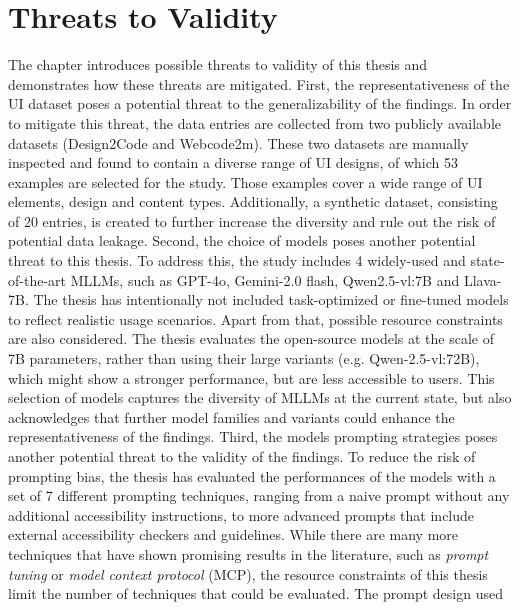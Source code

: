  \chapter{Threats to Validity}\label{chapter:threats}
The chapter introduces possible threats to validity of 
this thesis and demonstrates how these threats 
are mitigated.\newline
First, the representativeness of the UI dataset poses 
a potential threat to the generalizability of the findings.
In order to mitigate this threat, the data entries are 
collected from two publicly available datasets (Design2Code and Webcode2m).
These two datasets are manually inspected and found to contain a diverse 
range of UI designs, of which 53 examples are selected for the study. 
Those examples cover a wide range of UI elements, design and 
content types. Additionally, a synthetic dataset, consisting of 
20 entries, is created to 
further increase the diversity and rule out the risk of 
potential data leakage.\newline 
Second, the choice of models poses another potential threat 
to this thesis. To address this, the study includes 4 widely-used 
and state-of-the-art MLLMs, such as GPT-4o, Gemini-2.0 flash, Qwen2.5-vl:7B
and Llava-7B. The thesis has intentionally not included 
task-optimized or fine-tuned models to reflect realistic 
usage scenarios. Apart from that, possible resource constraints 
are also considered. The thesis evaluates the open-source 
models at the scale of 7B parameters, rather than using their 
large variants (e.g. Qwen-2.5-vl:72B), which might show 
a stronger performance, but are less accessible to users.
This selection of models captures the diversity of MLLMs at 
the current state, but also acknowledges that further 
model families and variants could enhance the representativeness of the findings.\newline
Third, the models prompting strategies poses another potential threat 
to the validity of the findings. To reduce the risk of 
prompting bias, the thesis has evaluated the performances of 
the models with a set of 7 different prompting techniques, 
ranging from a naive prompt without any additional accessibility instructions,
to more advanced prompts that include external accessibility
checkers and guidelines. While there are many more techniques 
that have shown promising results in the literature, such as 
\textit{prompt tuning} or \textit{model context protocol} (MCP), 
the resource constraints of this thesis limit the number of
techniques that could be evaluated. The prompt design used 
